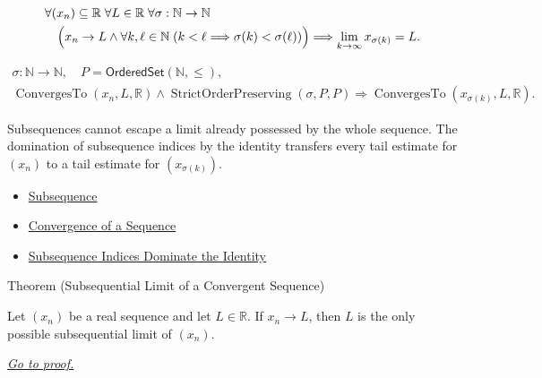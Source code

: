 \begin{remark*}
\[
\begin{aligned}
&\forall (x_n)\subseteq\mathbb{R}\;\forall L\in\mathbb{R}\;
\forall \sigma:\mathbb{N}\to\mathbb{N}\\
&\quad\Bigl(
  x_n\to L
  \land
  \forall k,\ell\in\mathbb{N}\;(k<\ell\Longrightarrow\sigma(k)<\sigma(\ell))
\Bigr)
\Longrightarrow
\lim_{k\to\infty}x_{\sigma(k)}=L.
\end{aligned}
\]
\end{remark*}

\begin{remark*}
\[
\begin{gathered}
\sigma\colon\mathbb{N}\to\mathbb{N},\quad
P=\mathsf{OrderedSet}(\mathbb{N},\leq),\\
\operatorname{ConvergesTo}(x_n,L,\mathbb{R})
\land
\operatorname{StrictOrderPreserving}(\sigma,P,P)
\Longrightarrow
\operatorname{ConvergesTo}(x_{\sigma(k)},L,\mathbb{R}).
\end{gathered}
\]
\end{remark*}

\begin{remark*}[Interpretation]
Subsequences cannot escape a limit already possessed by the whole sequence.
The domination of subsequence indices by the identity transfers every tail
estimate for $(x_n)$ to a tail estimate for $(x_{\sigma(k)})$.
\end{remark*}

\begin{dependencies}
\begin{itemize}
  \item \hyperref[def:subsequence-of-sequence]{Subsequence}
  \item \hyperref[def:convergent-sequence]{Convergence of a Sequence}
  \item \hyperref[thm:subsequence-indices-dominate-identity]{Subsequence Indices Dominate the Identity}
\end{itemize}
\end{dependencies}


\begin{theorembox}{Theorem (Subsequential Limit of a Convergent Sequence)}
\begin{theorem}
\label{thm:subsequential-limit-of-convergent-sequence}
Let $(x_n)$ be a real sequence and let $L\in\mathbb{R}$. If $x_n\to L$,
then $L$ is the only possible subsequential limit of $(x_n)$.

\smallskip
\noindent
\hyperref[prf:subsequential-limit-of-convergent-sequence]{\textit{Go to proof.}}
\end{theorem}
\end{theorembox}

